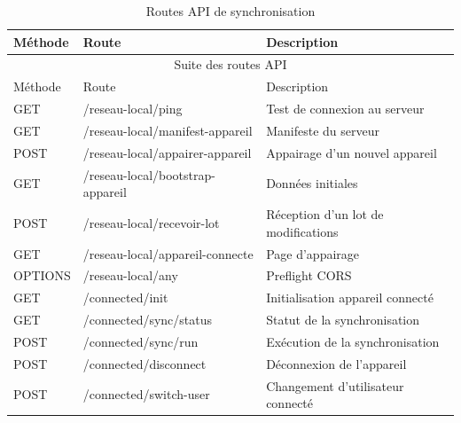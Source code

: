 \documentclass[12pt,a4paper,twoside]{report}
\begin{document}
\begin{longtable}{lll}
\caption{Routes API de synchronisation}\\
\toprule
Méthode & Route & Description \\
\midrule
\endfirsthead
\multicolumn{3}{c}{Suite des routes API}\\
\toprule
Méthode & Route & Description \\
\midrule
\endhead
\bottomrule
\endfoot
GET & /reseau-local/ping & Test de connexion au serveur \\
GET & /reseau-local/manifest-appareil & Manifeste du serveur \\
POST & /reseau-local/appairer-appareil & Appairage d'un nouvel appareil \\
GET & /reseau-local/bootstrap-appareil & Données initiales \\
POST & /reseau-local/recevoir-lot & Réception d'un lot de modifications \\
GET & /reseau-local/appareil-connecte & Page d'appairage \\
OPTIONS & /reseau-local/{any} & Preflight CORS \\
GET & /connected/init & Initialisation appareil connecté \\
GET & /connected/sync/status & Statut de la synchronisation \\
POST & /connected/sync/run & Exécution de la synchronisation \\
POST & /connected/disconnect & Déconnexion de l'appareil \\
POST & /connected/switch-user & Changement d'utilisateur connecté \\
\end{longtable}
\end{document}
